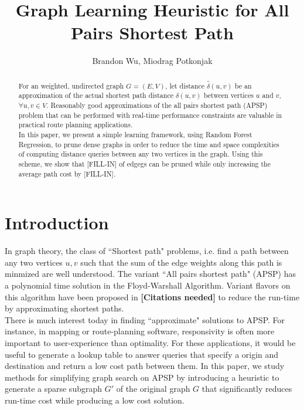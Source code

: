 \documentclass[journal]{IEEEtran}
\begin{document}
%
\title{Graph Learning Heuristic for All Pairs Shortest Path}
\author{Brandon Wu, Miodrag Potkonjak}
\maketitle

\begin{abstract}
For an weighted, undirected graph $G = (E,V)$, let distance $\hat{\delta}(u,v)$ be an approximation of the actual
shortest path distance $\delta(u,v)$ between vertices $u$ and $v$, $\forall u,v\in V$. Reasonably good
approximations of the all pairs shortest path (APSP) problem that can be performed with 
real-time performance constraints are valuable in practical route planning applications.\\

In this paper, we present a simple learning framework, using Random Forest Regression, to prune dense graphs
in order to reduce the time and space complexities of computing distance queries between any two vertices in
the graph. Using this scheme, we show that [FILL-IN] of edgegs can be pruned while only increasing the average
path cost by [FILL-IN].
\end{abstract}

\section{Introduction}
In graph theory, the class of ``Shortest path" problems, i.e. find a path between any two vertices $u,v$ such
that the sum of the edge weights along this path is minmized are well understood. The variant ``All pairs
shortest path" (APSP) has a polynomial time solution in the Floyd-Warshall Algorithm. Variant flavors on this
algorithm have been proposed in 
{\bf{[Citations needed]}}
to reduce the run-time by approximating shortest paths. \\

There is much interest today in finding ``approximate" solutions to APSP. For instance, in mapping or route-planning
software, responsivity is often more important to user-experience than optimality. For these applications, it would
be useful to generate a lookup table to answer queries that specify a origin and destination and return a
low cost path between them. In this paper, we study methods for simplifying graph search on APSP by introducing
a heuristic to generate a sparse subgraph $G'$ of the original graph $G$ that significantly reduces run-time
cost while producing a low cost solution.
\end{document}
